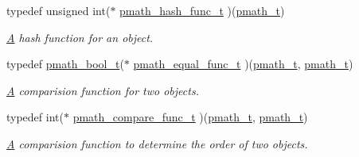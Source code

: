 \begin{CompactItemize}
typedef unsigned int($\ast$ \hyperlink{group__objects_gf7afa773c11a686f6abd7586e0a6a33d}{pmath\_\-hash\_\-func\_\-t} )(\hyperlink{classpmath__t}{pmath\_\-t})
\begin{CompactList}\small\item\em \hyperlink{class_a}{A} hash function for an object. \item\end{CompactList}\item 
typedef \hyperlink{group__general__types_gc92090cb0b56345d6c379ed2341d4ef4}{pmath\_\-bool\_\-t}($\ast$ \hyperlink{group__objects_g3596be6b7da718f547985fdde3d8edd1}{pmath\_\-equal\_\-func\_\-t} )(\hyperlink{classpmath__t}{pmath\_\-t}, \hyperlink{classpmath__t}{pmath\_\-t})
\begin{CompactList}\small\item\em \hyperlink{class_a}{A} comparision function for two objects. \item\end{CompactList}\item 
typedef int($\ast$ \hyperlink{group__objects_g9180e6d1f4ba84b77ea71414ce57677f}{pmath\_\-compare\_\-func\_\-t} )(\hyperlink{classpmath__t}{pmath\_\-t}, \hyperlink{classpmath__t}{pmath\_\-t})
\begin{CompactList}\small\item\em \hyperlink{class_a}{A} comparision function to determine the order of two objects. \item\end{CompactList}\end{CompactItemize}
